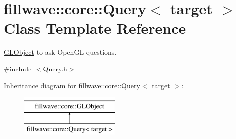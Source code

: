 \hypertarget{classfillwave_1_1core_1_1Query}{}\section{fillwave\+:\+:core\+:\+:Query$<$ target $>$ Class Template Reference}
\label{classfillwave_1_1core_1_1Query}


\hyperlink{classfillwave_1_1core_1_1GLObject}{G\+L\+Object} to ask Open\+G\+L questions.  




{\ttfamily \#include $<$Query.\+h$>$}

Inheritance diagram for fillwave\+:\+:core\+:\+:Query$<$ target $>$\+:\begin{figure}[H]
\begin{center}
\leavevmode
\includegraphics[height=2.000000cm]{classfillwave_1_1core_1_1Query}
\end{center}
\end{figure}
